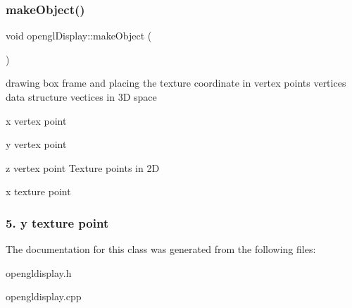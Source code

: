\subsubsection{\texorpdfstring{make\+Object()}{makeObject()}}
{\footnotesize\ttfamily void opengl\+Display\+::make\+Object (\begin{DoxyParamCaption}{ }\end{DoxyParamCaption})}

drawing box frame and placing the texture coordinate in vertex points vertices data structure vectices in 3D space
\begin{DoxyEnumerate}
\item x vertex point
\item y vertex point
\item z vertex point Texture points in 2D
\item x texture point \subsubsection*{5. y texture point }
\end{DoxyEnumerate}

The documentation for this class was generated from the following files\+:\begin{DoxyCompactItemize}
\item 
opengldisplay.\+h\item 
opengldisplay.\+cpp\end{DoxyCompactItemize}
